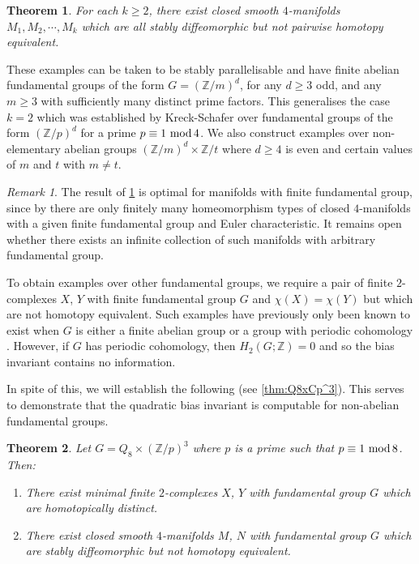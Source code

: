 \documentclass[11pt,a4paper,leqno]{amsart}
\newtheorem{thmx}{Theorem}
\theoremstyle{definition}
\theoremstyle{remark}
\newtheorem{remark}[theorem]{Remark}
\newenvironment{clist}[1]
{\begin{enumerate}[\normalfont #1]}
{\end{enumerate}}
\newcommand{\cy}[1]{\Z/{#1}}
\newcommand{\Z}{\mathbb{Z}}
\renewcommand{\mod}{\,\,\text{\normalfont mod}\,}
\begin{document}
\begin{thmx} \label{thmx:main-examples}
For each $k \geq 2$, there exist closed smooth $4$-manifolds $M_1, M_2, \cdots, M_k$ which are all stably diffeomorphic but not pairwise homotopy equivalent.
\end{thmx} 

These examples can be taken to be stably parallelisable and have finite abelian fundamental groups of the form $G = (\cy m)^d$, for any $d \ge 3$ odd, and any $m \geq 3$ with sufficiently many distinct prime factors. This generalises the case $k=2$ which was established by Kreck-Schafer \cite{Kreck:1984} over fundamental groups of the form $(\Z/p)^d$ for a prime 
 $p\equiv 1 \mod 4$. We also construct examples over non-elementary abelian groups $(\Z/m)^d \times \Z/t$ where $d \ge 4$ is even and certain values of $m$ and $t$ with $m \ne t$.

\begin{remark} 
The result of \cref{thmx:main-examples} is optimal for manifolds with finite fundamental group, since by \cite[Corollary 1.5]{Hambleton:1988} there are only finitely many homeomorphism types of closed $4$-manifolds with a given finite fundamental group and Euler characteristic.
It remains open whether there exists an infinite collection of such manifolds with arbitrary fundamental group.
\end{remark}

To obtain examples over other fundamental groups, we require a pair of finite $2$-complexes $X$, $Y$ with finite fundamental group $G$ and $\chi(X)=\chi(Y)$ but which are not homotopy equivalent. Such examples have previously only been known to exist when $G$ is either a finite abelian group \cite{Metzler:1976,Sieradski:1979} or a group with periodic cohomology \cite{Dy76,Ni20-II,Ni21}. 
However, if $G$ has periodic cohomology, then $H_2(G;\Z)=0$ \cite[Corollary 2]{Sw71} and so the bias invariant contains no information. 

In spite of this, we will establish the following (see \cref{thm:Q8xCp^3}). This serves to demonstrate that the quadratic bias invariant is computable for non-abelian fundamental groups.  
\begin{thmx} \label{thmx:Q8xCp^3}
Let $G = Q_8 \times (\Z/p)^3$ where $p$ is a prime such that $p \equiv 1 \mod 8$. Then:
\begin{clist}{(i)}
\item
There exist minimal finite $2$-complexes $X$, $Y$ with fundamental group $G$ which are homotopically distinct.
\item	
There exist closed smooth $4$-manifolds $M$, $N$ with fundamental group $G$ which are stably diffeomorphic but not homotopy equivalent. 
\end{clist}
\end{thmx}
\end{document}

